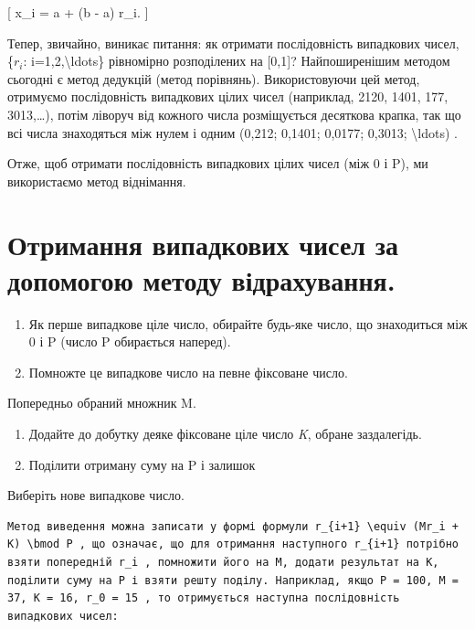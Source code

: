 \documentclass[
]{article}
\begin{document}
{[} x\_i = a + (b - a) r\_i. {]}

Тепер, звичайно, виникає питання: як отримати послідовність випадкових
чисел, \{\(r_i\): i=1,2,\textbackslash ldots\} рівномірно розподілених
на {[}0,1{]}? Найпоширенішим методом сьогодні є метод дедукцій (метод
порівнянь). Використовуючи цей метод, отримуємо послідовність випадкових
цілих чисел (наприклад, 2120, 1401, 177, 3013,\ldots), потім ліворуч від
кожного числа розміщується десяткова крапка, так що всі числа
знаходяться між нулем і одним (0,212; 0,1401; 0,0177; 0,3013;
\textbackslash ldots) .

Отже, щоб отримати послідовність випадкових цілих чисел (між 0 і P), ми
використаємо метод віднімання.

\section{Отримання випадкових чисел за допомогою методу
відрахування.}\label{ux43eux442ux440ux438ux43cux430ux43dux43dux44f-ux432ux438ux43fux430ux434ux43aux43eux432ux438ux445-ux447ux438ux441ux435ux43b-ux437ux430-ux434ux43eux43fux43eux43cux43eux433ux43eux44e-ux43cux435ux442ux43eux434ux443-ux432ux456ux434ux440ux430ux445ux443ux432ux430ux43dux43dux44f.}

\begin{enumerate}
\def\labelenumi{\arabic{enumi}.}
\item
  Як перше випадкове ціле число, обирайте будь-яке число, що знаходиться
  між 0 і P (число P обирається наперед).
\item
  Помножте це випадкове число на певне фіксоване число.
\end{enumerate}

Попередньо обраний множник M.

\begin{enumerate}
\def\labelenumi{\arabic{enumi}.}
\setcounter{enumi}{2}
\item
  Додайте до добутку деяке фіксоване ціле число \emph{K}, обране
  заздалегідь.
\item
  Поділити отриману суму на P і залишок
\end{enumerate}

Виберіть нове випадкове число.

\begin{verbatim}
Метод виведення можна записати у формі формули r_{i+1} \equiv (Mr_i + K) \bmod P , що означає, що для отримання наступного r_{i+1} потрібно взяти попередній r_i , помножити його на M, додати результат на K, поділити суму на P і взяти решту поділу. Наприклад, якщо P = 100, M = 37, K = 16, r_0 = 15 , то отримується наступна послідовність випадкових чисел:
\end{verbatim}
\end{document}
